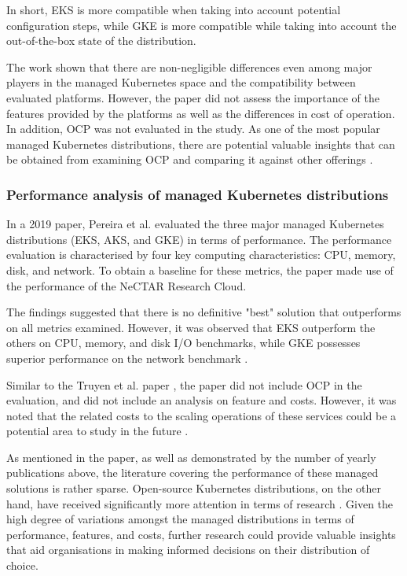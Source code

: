 In short, EKS is more compatible when taking into account potential configuration steps, while GKE is more compatible while taking into account the out-of-the-box state of the distribution.

The work shown that there are non-negligible differences even among major players in the managed Kubernetes space and the compatibility between evaluated platforms. However, the paper did not assess the importance of the features provided by the platforms as well as the differences in cost of operation. In addition, OCP was not evaluated in the study. As one of the most popular managed Kubernetes distributions, there are potential valuable insights that can be obtained from examining OCP and comparing it against other offerings \cite{redhatinc.StateKubernetesSecurity2024, vrabicDigitalTwinsUnderstanding2018, portworxKubernetesAdoptionSurvey2021, broadcomStateKubernetes20232023}.


\subsubsection{Performance analysis of managed Kubernetes distributions}

In a 2019 paper, Pereira et al. \cite{pereiraferreiraPerformanceEvaluationContainers2019} evaluated the three major managed Kubernetes distributions (EKS, AKS, and GKE) in terms of performance. The performance evaluation is characterised by four key computing characteristics: CPU, memory, disk, and network. To obtain a baseline for these metrics, the paper made use of the performance of the NeCTAR Research Cloud.

The findings suggested that there is no definitive "best" solution that outperforms on all metrics examined. However, it was observed that EKS outperform the others on CPU, memory, and disk I/O benchmarks, while GKE possesses superior performance on the network benchmark \cite{pereiraferreiraPerformanceEvaluationContainers2019}.

Similar to the Truyen et al. paper \cite{truyenManagingFeatureCompatibility2020}, the paper did not include OCP in the evaluation, and did not include an analysis on feature and costs. However, it was noted that the related costs to the scaling operations of these services could be a potential area to study in the future \cite{pereiraferreiraPerformanceEvaluationContainers2019}.

As mentioned in the paper, as well as demonstrated by the number of yearly publications above, the literature covering the performance of these managed solutions is rather sparse. Open-source Kubernetes distributions, on the other hand, have received significantly more attention in terms of research \cite{bohmProfilingLightweightContainer2021,koziolekLightweightKubernetesDistributions2023,ascensaoAssessingKubernetesDistributions2024,9660392,bryantKubernetesDeploymentOptions2024}. Given the high degree of variations amongst the managed distributions in terms of performance, features, and costs, further research could provide valuable insights that aid organisations in making informed decisions on their distribution of choice.

